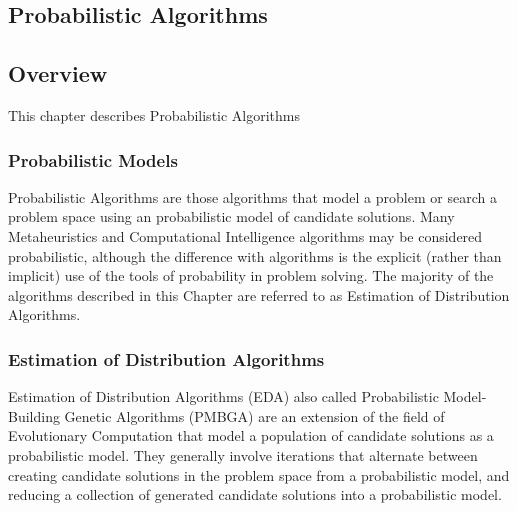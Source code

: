 

\renewcommand{\bibsection}{\subsection{\bibname}}
\begin{bibunit}

\chapter{Probabilistic Algorithms}
\label{ch:probabilistic}

\section{Overview}
This chapter describes Probabilistic Algorithms


\subsection{Probabilistic Models}
Probabilistic Algorithms are those algorithms that model a problem or search a problem space using an probabilistic model of candidate solutions. Many Metaheuristics and Computational Intelligence algorithms may be considered probabilistic, although the difference with algorithms is the explicit (rather than implicit) use of the tools of probability in problem solving. The majority of the algorithms described in this Chapter are referred to as Estimation of Distribution Algorithms.

\subsection{Estimation of Distribution Algorithms}
Estimation of Distribution Algorithms (EDA) also called Probabilistic Model-Building Genetic Algorithms (PMBGA) are an extension of the field of Evolutionary Computation that model a population of candidate solutions as a probabilistic model. They generally involve iterations that alternate between creating candidate solutions in the problem space from a probabilistic model, and reducing a collection of generated candidate solutions into a probabilistic model. 


\end{bibunit}
